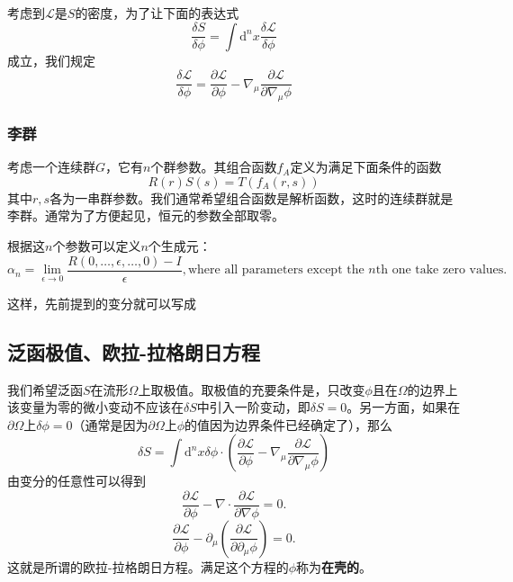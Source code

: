 \documentclass[UTF8, a4paper]{ctexart}
\begin{document}
考虑到$\mathcal{L}$是$S$的密度，为了让下面的表达式
\begin{equation}
    \frac{\delta S}{\delta \phi} = \int \mathrm{d}^n x \frac{\delta \mathcal{L}}{\delta \phi}
\end{equation}
成立，我们规定
\begin{equation}
    \frac{\delta \mathcal{L}}{\delta \phi} = \frac{\partial \mathcal{L}}{\partial \phi} - \nabla_\mu \frac{\partial \mathcal{L}}{\partial \nabla_\mu \phi}
    \label{eq:derivative-of-functional-density}
\end{equation}

\subsubsection{李群}
考虑一个连续群$G$，它有$n$个群参数。其组合函数$f_A$定义为满足下面条件的函数
\[
    R(r)S(s) = T(f_A(r,s))
\]
其中$r,s$各为一串群参数。我们通常希望组合函数是解析函数，这时的连续群就是李群。通常为了方便起见，恒元的参数全部取零。

根据这$n$个参数可以定义$n$个生成元：
\begin{equation}
    \alpha_n = \lim_{\epsilon \to 0} \frac{R(0, \ldots, \epsilon, \ldots, 0) - I}{\epsilon}, \text{where all parameters except the $n$th one take zero values}.
\end{equation}

这样，先前提到的变分就可以写成

\subsection{泛函极值、欧拉-拉格朗日方程}
我们希望泛函$S$在流形$\Omega$上取极值。取极值的充要条件是，只改变$\phi$且在$\Omega$的边界上该变量为零的微小变动不应该在$\delta S$中引入一阶变动，即$\delta S=0$。另一方面，如果在$\partial \Omega$上$\delta \phi = 0$（通常是因为$\partial \Omega$上$\phi$的值因为边界条件已经确定了），那么
\[
    \delta S = \int \mathrm{d}^n x  \delta \phi \cdot \left ( \frac{\partial \mathcal{L}}{\partial \phi} - \nabla_\mu \frac{\partial \mathcal{L}}{\partial \nabla_\mu \phi} \right)
\]
由变分的任意性可以得到
\begin{equation}
    \frac{\partial \mathcal{L}}{\partial \phi} - \nabla \cdot \frac{\partial \mathcal{L}}{\partial \nabla \phi} = 0.
    \label{eq:el-equation}
\end{equation}
\begin{equation}
    \frac{\partial \mathcal{L}}{\partial \phi} - \partial_\mu \left( \frac{\partial \mathcal{L}}{\partial \partial_\mu \phi} \right) = 0.
    \label{eq:el-equation-components}
\end{equation}
这就是所谓的欧拉-拉格朗日方程。满足这个方程的$\phi$称为\textbf{在壳的}。
\end{document}
